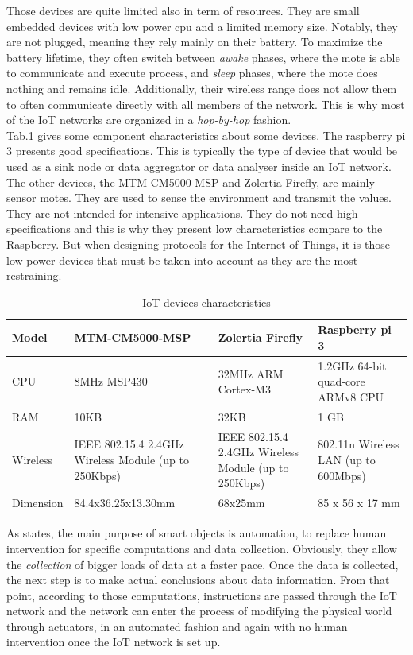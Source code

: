 Those devices are quite limited also in term of resources. They are small embedded devices with low power cpu and a limited memory size. Notably, they are not plugged, meaning they rely mainly on their battery. To maximize the battery lifetime, they often switch between \textit{awake} phases, where the mote is able to communicate and execute process, and \textit{sleep} phases, where the mote does nothing and remains idle. Additionally, their wireless range does not allow them to often communicate directly with all members of the network. This is why most of the IoT networks are organized in a \textit{hop-by-hop} fashion. \\

Tab.\ref{tab:sensors_char} gives some component characteristics about some devices. The raspberry pi 3 presents good specifications. This is typically the type of device that would be used as a sink node or data aggregator or data analyser inside an IoT network. The other devices, the MTM-CM5000-MSP and Zolertia Firefly, are mainly sensor motes. They are used to sense the environment and transmit the values. They are not intended for intensive applications. They do not need high specifications and this is why they present low characteristics compare to the Raspberry. But when designing protocols for the Internet of Things, it is those low power devices that must be taken into account as they are the most restraining. \\

\begin{table}
  \centering
  \begin{tabularx}{\textwidth}{|X|X|X|X|}
    \hline
    Model & MTM-CM5000-MSP & Zolertia Firefly & Raspberry pi 3 \\ \hline
    CPU & 8MHz MSP430 & 32MHz ARM Cortex-M3 & 1.2GHz 64-bit quad-core ARMv8 CPU\\ \hline
    RAM & 10KB & 32KB & 1 GB \\ \hline
    Wireless & IEEE 802.15.4 2.4GHz Wireless Module (up to 250Kbps) & IEEE 802.15.4 2.4GHz Wireless Module (up to 250Kbps) & 802.11n Wireless LAN (up to 600Mbps)\\ \hline
    Dimension & 84.4x36.25x13.30mm & 68x25mm & 85 x 56 x 17 mm \\ \hline
  \end{tabularx}
  \caption{IoT devices characteristics}
  \label{tab:sensors_char}

\end{table}

As \cite{chui2010internet} states, the main purpose of smart objects is automation, to replace human intervention for specific computations and data collection. Obviously, they allow the \textit{collection} of bigger loads of data at a faster pace. Once the data is collected, the next step is to make actual conclusions about data information. From that point, according to those computations, instructions are passed through the IoT network and the network can enter the process of modifying the physical world through actuators, in an automated fashion and again with no human intervention once the IoT network is set up.\\

